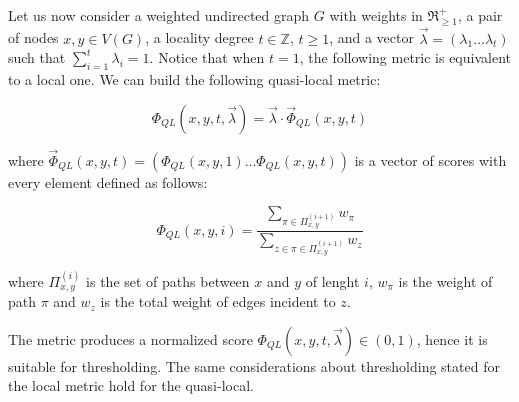 Let us now consider a weighted undirected graph $G$ with weights in $\Re_{\geq1}^{+}$, a pair of nodes $x,y\in V(G)$, a locality degree $t\in \mathbb{Z}$, $t\geq 1$, and a vector $\vec{\lambda}=(\lambda_{1}\ldots\lambda_{t})$ such that $\sum_{i=1}^{t}\lambda_{i}=1$. Notice that when $t=1$, the following metric is equivalent to a local one.
We can build the following quasi-local metric:

\begin{equation}
\label{eqn:detection-quasi-local-1}
\Phi_{QL}(x,y,t,\vec{\lambda})=\vec{\lambda}\cdot\vec{\Phi}_{QL}(x,y,t)
\end{equation}

where $\vec{\Phi}_{QL}(x,y,t)=(\Phi_{QL}(x,y,1)\ldots\Phi_{QL}(x,y,t))$ is a vector of scores with every element defined as follows:


%

\begin{equation}
\label{eqn:detection-quasi-local-3}
\Phi_{QL}(x,y,i)=
\frac{\sum\limits_{\pi\in\Pi_{x,y}^{(i+1)}}w_{\pi}}
{\sum\limits_{z\in\pi\in\Pi_{x,y}^{(i+1)}}w_{z}}
\end{equation}

where $\Pi_{x,y}^{(i)}$ is the set of paths between $x$ and $y$ of lenght $i$,
$w_{\pi}$ is the weight of path $\pi$ and
$w_{z}$ is the total weight of edges incident to $z$.

The metric produces a normalized score $\Phi_{QL}(x,y,t,\vec{\lambda})\in(0,1)$, hence it is suitable for thresholding. The same considerations about thresholding stated for the local metric hold for the quasi-local.


